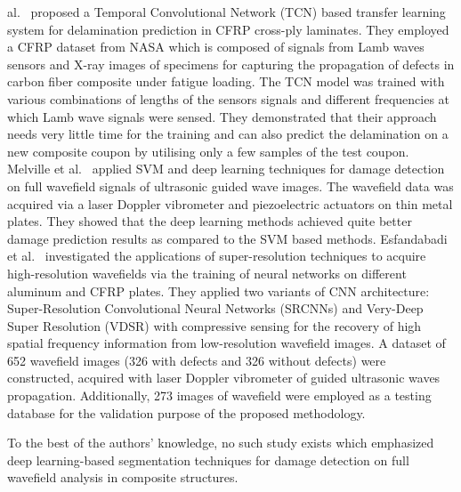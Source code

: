 al.~\cite{hussaintemporal} proposed a Temporal Convolutional Network (TCN) based transfer learning system for delamination prediction in CFRP cross-ply laminates. They employed a CFRP dataset from NASA which is composed of signals from Lamb waves sensors and X-ray images of specimens for capturing the propagation of defects in carbon fiber composite under fatigue loading. The TCN model was trained with various combinations of lengths of the sensors signals and different frequencies at which Lamb wave signals were sensed. They demonstrated that their approach needs very little time for the training and can also predict the delamination on a new composite coupon by utilising only a few samples of the test coupon. Melville et al.~\cite{melville2018structural} applied SVM and deep learning techniques for damage detection on full wavefield signals of ultrasonic guided wave images. The wavefield data was acquired via a laser Doppler vibrometer and piezoelectric actuators on thin metal plates. They showed that the deep learning methods achieved quite better damage prediction results as compared to the SVM based methods. Esfandabadi et al.~\cite{keshmiri2019deep} investigated the applications of super-resolution techniques to acquire high-resolution wavefields via the training of neural networks on different aluminum and CFRP plates. They applied two variants of CNN architecture: Super-Resolution Convolutional Neural Networks (SRCNNs) and Very-Deep Super Resolution (VDSR) with compressive sensing for the recovery of high spatial frequency information from low-resolution wavefield images. A dataset of 652 wavefield images (326 with defects and 326 without defects) were constructed, acquired with laser Doppler vibrometer of guided ultrasonic waves propagation. Additionally, 273 images of wavefield were employed as a testing database for the validation purpose of the proposed methodology.           

To the best of the authors' knowledge, no such study exists which emphasized deep learning-based segmentation techniques for damage detection on full wavefield analysis in composite structures.